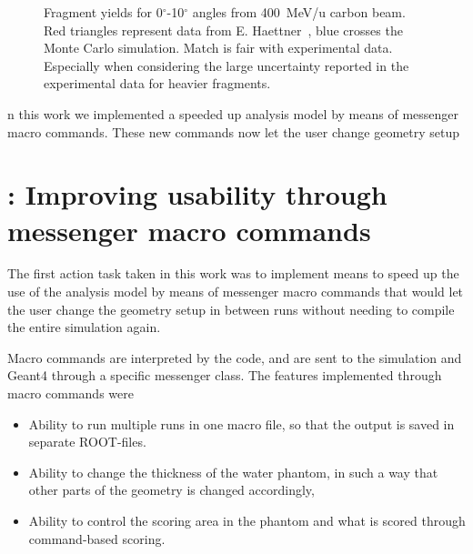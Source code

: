 \begin{figure}[!ht]
{\label{fig:fragmentYieldsForB}
}
\label{fig:fragmentYieldsZeroToTenDegrees}
\caption[Optional caption for list of figures]{Fragment yields for 0$^{\circ}$-10$^{\circ}$ angles from 400~MeV/u carbon beam. Red triangles represent data from E. Haettner~\cite{ehaettner}, blue crosses the Monte Carlo simulation. Match is fair with experimental data. Especially when considering the large uncertainty reported in the experimental data for heavier fragments.}
\end{figure}

\clearpage
\clearpage
n this work we implemented a speeded up analysis model
by means of messenger macro commands. These new commands now let the
user change geometry setup 


\renewcommand{\theequation}{C\arabic{equation}}
\setcounter{equation}{0}  
\renewcommand{\thefigure}{C\arabic{figure}}
\setcounter{figure}{0}
\renewcommand{\thetable}{C\arabic{table}}
\setcounter{table}{0}
\renewcommand{\thesection}{C}
\setcounter{section}{1}
\section{\label{AppendixD}: Improving usability through messenger macro commands}

The first action task taken in this work was to implement means to speed up the use of the analysis model by means of messenger macro commands that would let the user change the geometry setup in between runs without needing to compile the entire simulation again.

Macro commands are interpreted by the code, and are sent to the simulation and Geant4 through a specific messenger class. The features implemented through macro commands were
\begin{itemize}
\item Ability to run multiple runs in one macro file, so that the output is saved in separate ROOT-files.
\item Ability to change the thickness of the water phantom, in such a way that other parts of the geometry is changed accordingly,
\item Ability to control the scoring area in the phantom and what is scored through command-based scoring.
\end{itemize}


